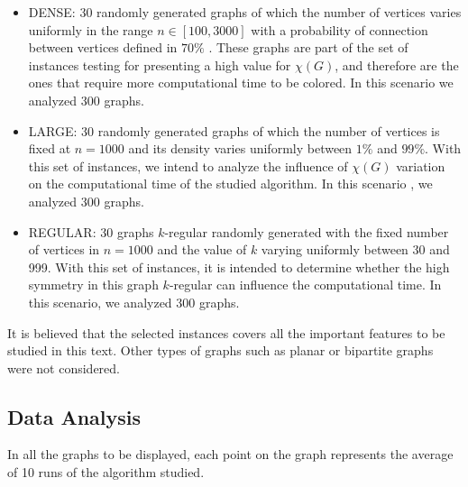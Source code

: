 \documentclass{article}
\begin{document}
\begin{itemize}

\item DENSE:  30 randomly generated graphs of which the number of vertices varies uniformly in the range $ n \in [ 100 , 3000 ] $ with a probability of connection between vertices defined in $70\%$ . These graphs are part of the set of instances testing for presenting a high value for $\chi(G)$, and therefore are the ones that require more computational time to be colored. In this scenario we analyzed 300 graphs.
	
\item LARGE: 30 randomly generated graphs of which the number of vertices is fixed at $n = 1000$ and its density varies uniformly between $1\%$ and $99\%$. With this set of instances, we intend to analyze the influence of $\chi(G)$ variation on the computational time of the studied algorithm. In this scenario , we analyzed 300 graphs.
	
\item REGULAR: 30 graphs $k$-regular randomly generated  with the fixed number of vertices in $n = 1000$ and the value of $k$ varying uniformly between 30 and 999. With this set of instances, it is intended to determine whether the high symmetry in this graph $k$-regular can influence the computational time. In this scenario, we analyzed 300 graphs.

\end{itemize}

It is believed that the selected instances covers all the important features to be studied in this text. Other types of graphs such as  planar or  bipartite graphs were not considered. 

\subsection{Data Analysis}

In all the graphs to be displayed, each point on the graph represents the average of 10 runs of the algorithm studied. 


\end{document}
